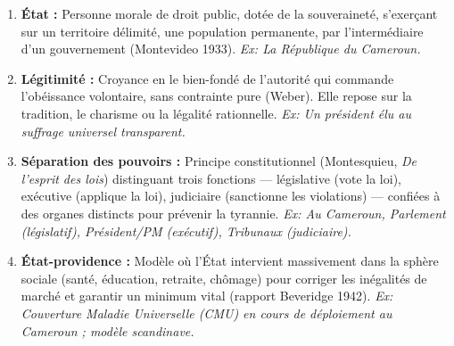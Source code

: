 \documentclass[11pt]{article}
\begin{document}
\begin{corrige}
\begin{enumerate}
\item \textbf{État :} Personne morale de droit public, dotée de la souveraineté, s'exerçant sur un territoire délimité, une population permanente, par l'intermédiaire d'un gouvernement (Montevideo 1933). \emph{Ex: La République du Cameroun.}
\item \textbf{Légitimité :} Croyance en le bien-fondé de l'autorité qui commande l'obéissance volontaire, sans contrainte pure (Weber). Elle repose sur la tradition, le charisme ou la légalité rationnelle. \emph{Ex: Un président élu au suffrage universel transparent.}
\item \textbf{Séparation des pouvoirs :} Principe constitutionnel (Montesquieu, \emph{De l'esprit des lois}) distinguant trois fonctions — législative (vote la loi), exécutive (applique la loi), judiciaire (sanctionne les violations) — confiées à des organes distincts pour prévenir la tyrannie. \emph{Ex: Au Cameroun, Parlement (législatif), Président/PM (exécutif), Tribunaux (judiciaire).}
\item \textbf{État-providence :} Modèle où l'État intervient massivement dans la sphère sociale (santé, éducation, retraite, chômage) pour corriger les inégalités de marché et garantir un minimum vital (rapport Beveridge 1942). \emph{Ex: Couverture Maladie Universelle (CMU) en cours de déploiement au Cameroun ; modèle scandinave.}
\end{enumerate}
\end{corrige}
\end{document}
